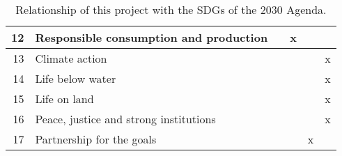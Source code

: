 \begin{table}
\begin{tabular}{|rp{7.15cm}|cccc|}
        \multicolumn{1}{|r|}{12} & Responsible consumption and production & \multicolumn{1}{c|}{} & \multicolumn{1}{c|}{x} & \multicolumn{1}{c|}{} &  \\ \hline
        \multicolumn{1}{|r|}{13} & Climate action & \multicolumn{1}{c|}{} & \multicolumn{1}{c|}{} & \multicolumn{1}{c|}{} & x \\ \hline
        \multicolumn{1}{|r|}{14} & Life below water & \multicolumn{1}{c|}{} & \multicolumn{1}{c|}{} & \multicolumn{1}{c|}{} & x \\ \hline
        \multicolumn{1}{|r|}{15} & Life on land & \multicolumn{1}{c|}{} & \multicolumn{1}{c|}{} & \multicolumn{1}{c|}{} & x \\ \hline
        \multicolumn{1}{|r|}{16} & Peace, justice and strong institutions & \multicolumn{1}{c|}{} & \multicolumn{1}{c|}{} & \multicolumn{1}{c|}{} & x \\ \hline
        \multicolumn{1}{|r|}{17} & Partnership for the goals & \multicolumn{1}{c|}{} & \multicolumn{1}{c|}{} & \multicolumn{1}{c|}{x} & \\ \hline
    \end{tabular}

    \caption{Relationship of this project with the SDGs of the 2030 Agenda.}
    \label{tab:a:sdg}
\end{table}